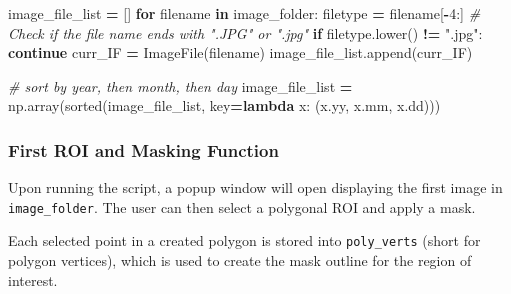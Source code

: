 \documentclass[
]{article}
\newenvironment{Shaded}{\begin{snugshade}}{\end{snugshade}}
\newcommand{\BuiltInTok}[1]{#1}
\newcommand{\CommentTok}[1]{\textcolor[rgb]{0.56,0.35,0.01}{\textit{#1}}}
\newcommand{\ControlFlowTok}[1]{\textcolor[rgb]{0.13,0.29,0.53}{\textbf{#1}}}
\newcommand{\DecValTok}[1]{\textcolor[rgb]{0.00,0.00,0.81}{#1}}
\newcommand{\KeywordTok}[1]{\textcolor[rgb]{0.13,0.29,0.53}{\textbf{#1}}}
\newcommand{\NormalTok}[1]{#1}
\newcommand{\OperatorTok}[1]{\textcolor[rgb]{0.81,0.36,0.00}{\textbf{#1}}}
\newcommand{\StringTok}[1]{\textcolor[rgb]{0.31,0.60,0.02}{#1}}
\begin{document}
\begin{Shaded}
\begin{Highlighting}[]
\NormalTok{image\_file\_list }\OperatorTok{=}\NormalTok{ []}
\ControlFlowTok{for}\NormalTok{ filename }\KeywordTok{in}\NormalTok{ image\_folder:}
\NormalTok{    filetype }\OperatorTok{=}\NormalTok{ filename[}\OperatorTok{{-}}\DecValTok{4}\NormalTok{:]}
    \CommentTok{\# Check if the file name ends with ".JPG" or ".jpg"}
    \ControlFlowTok{if}\NormalTok{ filetype.lower() }\OperatorTok{!=} \StringTok{".jpg"}\NormalTok{:}
        \ControlFlowTok{continue}
\NormalTok{    curr\_IF }\OperatorTok{=}\NormalTok{ ImageFile(filename)}
\NormalTok{    image\_file\_list.append(curr\_IF)}

\CommentTok{\# sort by year, then month, then day}
\NormalTok{image\_file\_list }\OperatorTok{=}\NormalTok{ np.array(}\BuiltInTok{sorted}\NormalTok{(image\_file\_list, key}\OperatorTok{=}\KeywordTok{lambda}\NormalTok{ x: (x.yy, x.mm, x.dd)))}
\end{Highlighting}
\end{Shaded}

\hypertarget{first-roi-and-masking-function}{%
\subsubsection{First ROI and Masking Function}\label{first-roi-and-masking-function}}

Upon running the script, a popup window will open displaying the first image in \texttt{image\_folder}. The user can then select a polygonal ROI and apply a mask.

Each selected point in a created polygon is stored into \texttt{poly\_verts} (short for polygon vertices), which is used to create the mask outline for the region of interest.
\end{document}
